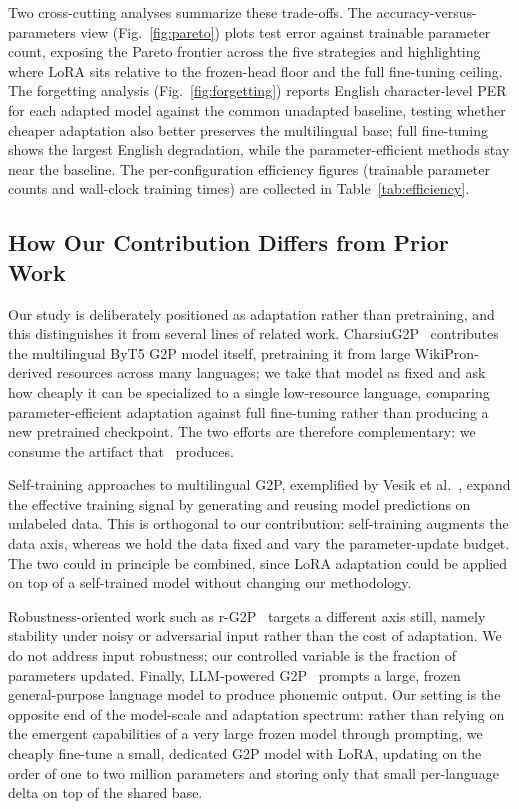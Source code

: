 \documentclass[conference]{IEEEtran}
\begin{document}
Two cross-cutting analyses summarize these trade-offs. The accuracy-versus-parameters view (Fig.~\ref{fig:pareto}) plots test error against trainable parameter count, exposing the Pareto frontier across the five strategies and highlighting where LoRA sits relative to the frozen-head floor and the full fine-tuning ceiling. The forgetting analysis (Fig.~\ref{fig:forgetting}) reports English character-level PER for each adapted model against the common unadapted baseline, testing whether cheaper adaptation also better preserves the multilingual base; full fine-tuning shows the largest English degradation, while the parameter-efficient methods stay near the baseline. The per-configuration efficiency figures (trainable parameter counts and wall-clock training times) are collected in Table~\ref{tab:efficiency}.

\subsection{How Our Contribution Differs from Prior Work}

Our study is deliberately positioned as adaptation rather than pretraining, and this distinguishes it from several lines of related work. CharsiuG2P~\cite{zhu2022} contributes the multilingual ByT5 G2P model itself, pretraining it from large WikiPron-derived resources across many languages; we take that model as fixed and ask how cheaply it can be specialized to a single low-resource language, comparing parameter-efficient adaptation against full fine-tuning rather than producing a new pretrained checkpoint. The two efforts are therefore complementary: we consume the artifact that~\cite{zhu2022} produces.

Self-training approaches to multilingual G2P, exemplified by Vesik et al.~\cite{vesik2020}, expand the effective training signal by generating and reusing model predictions on unlabeled data. This is orthogonal to our contribution: self-training augments the data axis, whereas we hold the data fixed and vary the parameter-update budget. The two could in principle be combined, since LoRA adaptation could be applied on top of a self-trained model without changing our methodology.

Robustness-oriented work such as r-G2P~\cite{zhao2022} targets a different axis still, namely stability under noisy or adversarial input rather than the cost of adaptation. We do not address input robustness; our controlled variable is the fraction of parameters updated. Finally, LLM-powered G2P~\cite{fetrat2024} prompts a large, frozen general-purpose language model to produce phonemic output. Our setting is the opposite end of the model-scale and adaptation spectrum: rather than relying on the emergent capabilities of a very large frozen model through prompting, we cheaply fine-tune a small, dedicated G2P model with LoRA, updating on the order of one to two million parameters and storing only that small per-language delta on top of the shared base.
\end{document}
